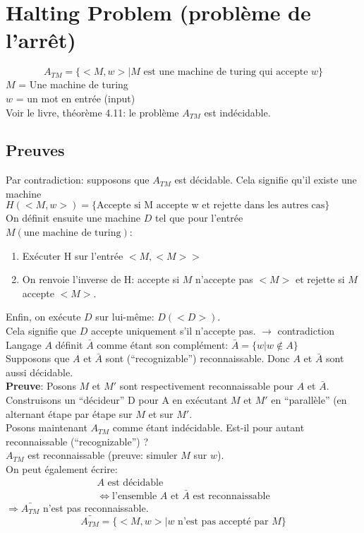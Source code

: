 \documentclass[a4paper,12pt]{article}
\begin{document}
\section{Halting Problem (problème de l'arrêt)}
  $$A_{TM} = \{ <M, w> | M \text{ est une machine de turing qui accepte } w\}$$ 
  $M$ = Une machine de turing\\
  $w$ = un mot en entrée (input)\\
  Voir le livre, théorème 4.11: le problème $A_{TM}$ est indécidable.\\
  
  \subsection{Preuves}
    Par contradiction: supposons que $A_{TM}$ est décidable.  Cela signifie qu'il existe une machine $H(<M,w>) = \{\text{Accepte si M accepte w et rejette dans les autres cas}\}$\\
    On définit ensuite une machine $D$ tel que pour l'entrée $M (\text{une machine de turing})$:
    \begin{enumerate}
      \item Exécuter H sur l'entrée $<M, <M>>$
      \item On renvoie l'inverse de H: accepte si $M$ n'accepte pas $<M>$ et rejette si $M$ accepte $<M>$.
    \end{enumerate}
    Enfin, on exécute $D$ sur lui-même: $D(<D>)$.\\
    Cela signifie que $D$ accepte uniquement s'il n'accepte pas. $\rightarrow$ contradiction
  \\
  Langage $A$ définit $\bar{A}$ comme étant son complément: $\bar{A} = \{w | w \notin A\}$\\
  Supposons que $A$ et $\bar{A}$ sont (``recognizable'') reconnaissable.  Donc $A$ et $\bar{A}$ sont aussi décidable.\\
  \textbf{Preuve}: Posons $M$ et $M'$ sont respectivement reconnaissable pour $A$ et $\bar{A}$.  Construisons un ``décideur'' D pour A en exécutant $M$ et $M'$ en ``parallèle'' (en alternant étape par étape sur $M$ et sur $M'$.\\

  Posons maintenant $A_{TM}$ comme étant indécidable.  Est-il pour autant reconnaissable (``recognizable'') ?\\
  $A_{TM}$ est reconnaissable (preuve: simuler $M$ sur $w$).\\
  On peut également écrire:
  \begin{align*}
    A \text{ est décidable}\\
    \Leftrightarrow \text{l'ensemble }A \text{ et } \bar{A} \text{ est reconnaissable}
  \end{align*}
  $\Rightarrow \bar{A_{TM}}$ n'est pas reconnaissable.\\
  $$\bar{A_{TM}} = \{<M, w> | w \text{ n'est pas accepté par } M\}$$
\end{document}
